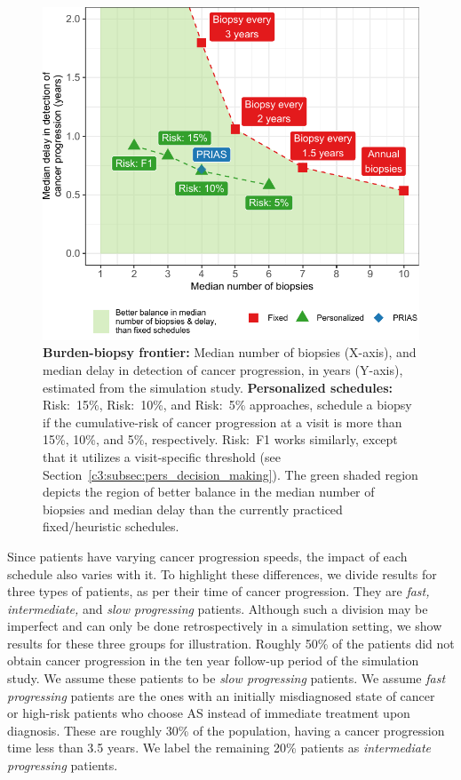 \begin{figure}
\includegraphics{contents/c3/images/c3_fig5.pdf}
\caption{\textbf{Burden-biopsy frontier:} Median number of biopsies (X-axis), and median delay in detection of cancer progression, in years (Y-axis), estimated from the simulation study. \textbf{Personalized schedules:} Risk:~15\%, Risk:~10\%, and Risk:~5\% approaches, schedule a biopsy if the cumulative-risk of cancer progression at a visit is more than 15\%, 10\%, and 5\%, respectively. Risk:~F1 works similarly, except that it utilizes a visit-specific threshold (see Section~\ref{c3:subsec:pers_decision_making}). The green shaded region depicts the region of better balance in the median number of biopsies and median delay than the currently practiced fixed/heuristic schedules.}
\label{c3:fig:5}
\end{figure}

Since patients have varying cancer progression speeds, the impact of each schedule also varies with it. To highlight these differences, we divide results for three types of patients, as per their time of cancer progression. They are \emph{fast, intermediate,} and \emph{slow progressing} patients. Although such a division may be imperfect and can only be done retrospectively in a simulation setting, we show results for these three groups for illustration. Roughly 50\% of the patients did not obtain cancer progression in the ten year follow-up period of the simulation study. We assume these patients to be \emph{slow progressing} patients. We assume \emph{fast progressing} patients are the ones with an initially misdiagnosed state of cancer~\citep{cooperberg2011outcomes} or high-risk patients who choose AS instead of immediate treatment upon diagnosis. These are roughly 30\% of the population, having a cancer progression time less than 3.5 years. We label the remaining 20\% patients as \emph{intermediate progressing} patients. 

